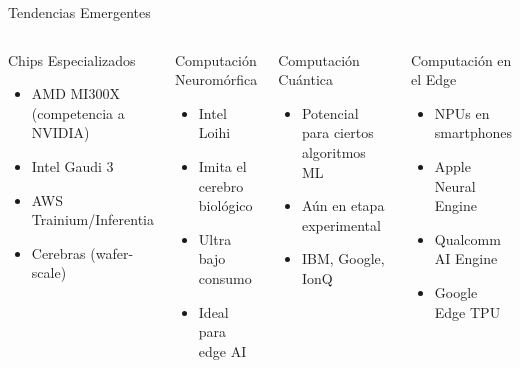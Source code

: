 \documentclass[aspectratio=169]{beamer}
\begin{document}
\begin{frame}{Tendencias Emergentes}
    \begin{columns}[t]
        \begin{block}{Chips Especializados}
            \begin{itemize}
                \item AMD MI300X (competencia a NVIDIA)
                \item Intel Gaudi 3
                \item AWS Trainium/Inferentia
                \item Cerebras (wafer-scale)
            \end{itemize}
        \end{block}
        
        \begin{block}{Computación Neuromórfica}
            \begin{itemize}
                \item Intel Loihi
                \item Imita el cerebro biológico
                \item Ultra bajo consumo
                \item Ideal para edge AI
            \end{itemize}
        \end{block}
        
        \begin{block}{Computación Cuántica}
            \begin{itemize}
                \item Potencial para ciertos algoritmos ML
                \item Aún en etapa experimental
                \item IBM, Google, IonQ
            \end{itemize}
        \end{block}
        
        \begin{block}{Computación en el Edge}
            \begin{itemize}
                \item NPUs en smartphones
                \item Apple Neural Engine
                \item Qualcomm AI Engine
                \item Google Edge TPU
            \end{itemize}
        \end{block}
    \end{columns}
\end{frame}
\end{document}
